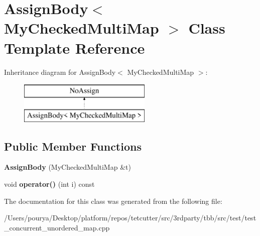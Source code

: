 \hypertarget{classAssignBody_3_01MyCheckedMultiMap_01_4}{}\section{Assign\+Body$<$ My\+Checked\+Multi\+Map $>$ Class Template Reference}
\label{classAssignBody_3_01MyCheckedMultiMap_01_4}
Inheritance diagram for Assign\+Body$<$ My\+Checked\+Multi\+Map $>$\+:\begin{figure}[H]
\begin{center}
\leavevmode
\includegraphics[height=2.000000cm]{classAssignBody_3_01MyCheckedMultiMap_01_4}
\end{center}
\end{figure}
\subsection*{Public Member Functions}
\begin{DoxyCompactItemize}
\item 
\hypertarget{classAssignBody_3_01MyCheckedMultiMap_01_4_a38424764e670933b4f073d3a3f157179}{}{\bfseries Assign\+Body} (My\+Checked\+Multi\+Map \&t)\label{classAssignBody_3_01MyCheckedMultiMap_01_4_a38424764e670933b4f073d3a3f157179}

\item 
\hypertarget{classAssignBody_3_01MyCheckedMultiMap_01_4_aae757aa67cfd8788e0b376990dbf5149}{}void {\bfseries operator()} (int i) const \label{classAssignBody_3_01MyCheckedMultiMap_01_4_aae757aa67cfd8788e0b376990dbf5149}

\end{DoxyCompactItemize}


The documentation for this class was generated from the following file\+:\begin{DoxyCompactItemize}
\item 
/\+Users/pourya/\+Desktop/platform/repos/tetcutter/src/3rdparty/tbb/src/test/test\+\_\+concurrent\+\_\+unordered\+\_\+map.\+cpp\end{DoxyCompactItemize}
